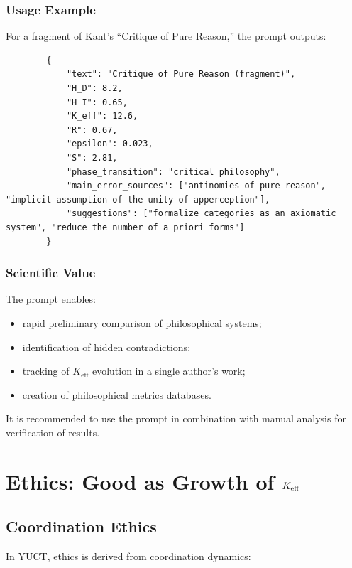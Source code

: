 \documentclass[12pt,a4paper]{article}
\begin{document}
	\subsubsection{Usage Example}
	
	For a fragment of Kant's ``Critique of Pure Reason,'' the prompt outputs:
	
	\begin{verbatim}
		{
			"text": "Critique of Pure Reason (fragment)",
			"H_D": 8.2,
			"H_I": 0.65,
			"K_eff": 12.6,
			"R": 0.67,
			"epsilon": 0.023,
			"S": 2.81,
			"phase_transition": "critical philosophy",
			"main_error_sources": ["antinomies of pure reason", "implicit assumption of the unity of apperception"],
			"suggestions": ["formalize categories as an axiomatic system", "reduce the number of a priori forms"]
		}
	\end{verbatim}
	
	\subsubsection{Scientific Value}
	
	The prompt enables:
	\begin{itemize}
		\item rapid preliminary comparison of philosophical systems;
		\item identification of hidden contradictions;
		\item tracking of \(K_{\mathrm{eff}}\) evolution in a single author's work;
		\item creation of philosophical metrics databases.
	\end{itemize}
	
	It is recommended to use the prompt in combination with manual analysis for verification of results.
	
	\section{Ethics: Good as Growth of \texorpdfstring{\(\Keff\)}{K\_eff}}
	
	\subsection{Coordination Ethics}
	
	In YUCT, ethics is derived from coordination dynamics:
	
\end{document}
